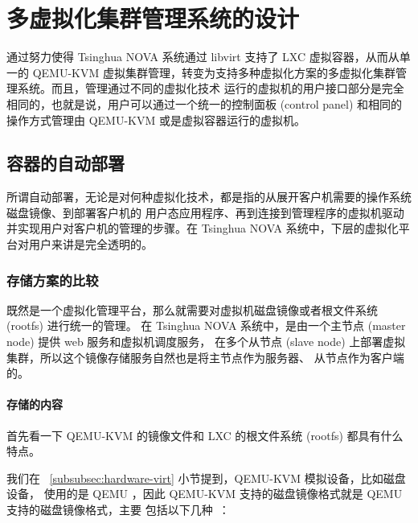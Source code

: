 \chapter{多虚拟化集群管理系统的设计}
\label{cha:multi-hypervisor-management-system}

通过努力使得 Tsinghua NOVA 系统通过 libvirt 支持了 LXC 虚拟容器，从而从单一的 QEMU-KVM
虚拟集群管理，转变为支持多种虚拟化方案的多虚拟化集群管理系统。而且，管理通过不同的虚拟化技术
运行的虚拟机的用户接口部分是完全相同的，也就是说，用户可以通过一个统一的控制面板 (control
panel) 和相同的操作方式管理由 QEMU-KVM 或是虚拟容器运行的虚拟机。

\section{容器的自动部署}
\label{sec:auto-deployment}

所谓自动部署，无论是对何种虚拟化技术，都是指的从展开客户机需要的操作系统磁盘镜像、到部署客户机的
用户态应用程序、再到连接到管理程序的虚拟机驱动并实现用户对客户机的管理的步骤。在 Tsinghua NOVA
系统中，下层的虚拟化平台对用户来讲是完全透明的。

\subsection{存储方案的比较}
\label{subsec:comparison-network-storage}

既然是一个虚拟化管理平台，那么就需要对虚拟机磁盘镜像或者根文件系统 (rootfs) 进行统一的管理。
在 Tsinghua NOVA 系统中，是由一个主节点 (master node) 提供 web 服务和虚拟机调度服务，
在多个从节点 (slave node) 上部署虚拟集群，所以这个镜像存储服务自然也是将主节点作为服务器、
从节点作为客户端的。

\subsubsection{存储的内容}

首先看一下 QEMU-KVM 的镜像文件和 LXC 的根文件系统 (rootfs) 都具有什么特点。

我们在 ~\ref{subsubsec:hardware-virt} 小节提到，QEMU-KVM 模拟设备，比如磁盘设备，
使用的是 QEMU ，因此 QEMU-KVM 支持的磁盘镜像格式就是 QEMU 支持的磁盘镜像格式，主要
包括以下几种~\cite{docker-in-practice}：

